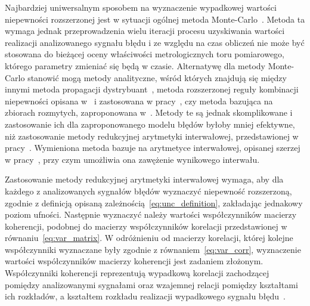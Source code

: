Najbardziej uniwersalnym sposobem na wyznaczenie wypadkowej wartości niepewności rozszerzonej jest w sytuacji ogólnej metoda Monte-Carlo~\cite{jcgm_montecarlo}. Metoda ta wymaga jednak przeprowadzenia wielu iteracji procesu uzyskiwania wartości realizacji analizowanego sygnału błędu i ze względu na czas obliczeń nie może być stosowana do bieżącej oceny właściwości metrologicznych toru pomiarowego, którego parametry zmieniać się będą w czasie. Alternatywę dla metody Monte-Carlo stanowić mogą metody analityczne, wśród których znajdują się między innymi metoda propagacji dystrybuant~\cite{koliander_fusion, zhang_pdp}, metoda rozszerzonej reguły kombinacji niepewności opisana w~\cite{dieck_measurement} i zastosowana w pracy~\cite{yang_euc}, czy metoda bazująca na zbiorach rozmytych, zaproponowana w~\cite{urbanski_fuzzy}. Metody te są jednak skomplikowane i zastosowanie ich dla zaproponowanego modelu błędów byłoby mniej efektywne, niż zastosowanie metody redukcyjnej arytmetyki interwałowej, przedstawionej w pracy~\cite{jakubiec_redmono}. Wymieniona metoda bazuje na arytmetyce interwałowej, opisanej szerzej w pracy~\cite{moore_interval}, przy czym umożliwia ona zawężenie wynikowego interwału.

Zastosowanie metody redukcyjnej arytmetyki interwałowej wymaga, aby dla każdego z analizowanych sygnałów błędów wyznaczyć niepewność rozszerzoną, zgodnie z definicją opisaną zależnością~\eqref{eq:unc_definition}, zakładając jednakowy poziom ufności. Następnie wyznaczyć należy wartości współczynników macierzy koherencji, podobnej do macierzy współczynników korelacji przedstawionej w równaniu~\eqref{eq:var_matrix}. W odróżnieniu od macierzy korelacji, której kolejne współczynniki wyznaczane były zgodnie z równaniem~\eqref{eq:var_corr}, wyznaczenie wartości współczynników macierzy koherencji jest zadaniem złożonym. Współczynniki koherencji reprezentują wypadkową korelacji zachodzącej pomiędzy analizowanymi sygnałami oraz wzajemnej relacji pomiędzy kształtami ich rozkładów, a kształtem rozkładu realizacji wypadkowego sygnału błędu~\cite{jakubiec_system}.


